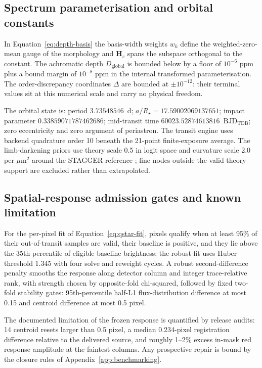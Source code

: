 \subsection{Spectrum parameterisation and orbital constants}

In Equation~\ref{eq:depth-basis} the basis-width weights $w_k$ define the
weighted-zero-mean gauge of the morphology and $\bm{H}_v$ spans the
subspace orthogonal to the constant. The achromatic depth
$D_{\mathrm{global}}$ is bounded below by a floor of $10^{-6}$ ppm plus a
bound margin of $10^{-8}$ ppm in the internal transformed
parameterisation. The order-discrepancy coordinates $\Delta$ are bounded
at $\pm 10^{-12}$: their terminal values sit at this numerical scale and
carry no physical freedom.

The orbital state is: period $3.73548546$~d;
$a/R_\star=17.59002069137651$; impact parameter $0.33859071787462686$;
mid-transit time $60023.52874613816$~$\mathrm{BJD_{TDB}}$; zero
eccentricity and zero argument of periastron. The transit engine uses backend quadrature order 10 beneath
the 21-point finite-exposure average. The limb-darkening priors use
theory scale 0.5 in logit space and curvature scale 2.0 per
$\mu\mathrm{m}^2$ around the STAGGER reference \citep{MagicEtAl2015};
fine nodes outside the valid theory support are excluded rather than
extrapolated.

\subsection{Spatial-response admission gates and known limitation}

For the per-pixel fit of Equation~\ref{eq:qstar-fit}, pixels qualify when
at least 95\% of their out-of-transit samples are valid, their baseline is
positive, and they lie above the 35th percentile of eligible baseline
brightness; the robust fit uses Huber threshold 1.345 with four solve and
reweight cycles. A robust second-difference penalty smooths the response
along detector column and integer trace-relative rank, with strength
chosen by opposite-fold chi-squared, followed by fixed two-fold stability
gates: 95th-percentile half-L1 flux-distribution difference at most 0.15
and centroid difference at most 0.5 pixel.

The documented limitation of the frozen response is quantified by release
audits: 14 centroid resets larger than 0.5 pixel, a median 0.234-pixel
registration difference relative to the delivered source, and roughly
1--2\% excess in-mask red response amplitude at the faintest columns. Any
prospective repair is bound by the closure rules of
Appendix~\ref{app:benchmarking}.


